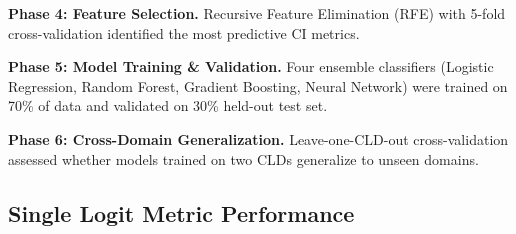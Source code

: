\textbf{Phase 4: Feature Selection.} Recursive Feature Elimination (RFE) with 5-fold cross-validation identified the most predictive CI metrics.

\textbf{Phase 5: Model Training \& Validation.} Four ensemble classifiers (Logistic Regression, Random Forest, Gradient Boosting, Neural Network) were trained on 70\% of data and validated on 30\% held-out test set.

\textbf{Phase 6: Cross-Domain Generalization.} Leave-one-CLD-out cross-validation assessed whether models trained on two CLDs generalize to unseen domains.

\subsection{Single Logit Metric Performance}

